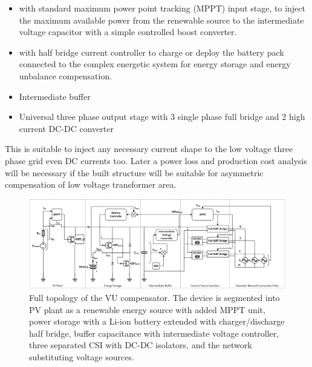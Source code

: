         \begin{itemize}

            \item {} with standard maximum power point tracking (MPPT) input stage, to inject the maximum available power from the renewable source to the intermediate voltage capacitor with a simple controlled boost converter.
            \item {} with half bridge current controller to charge or deploy the battery pack connected to the complex energetic system for energy storage and energy unbalance compensation.
            \item Intermediate buffer 
            \item Universal three phase output stage with 3 single phase full bridge  and 2 high current DC-DC converter
        \end{itemize}
    This is suitable to inject any necessary current shape to the low voltage three phase grid even DC currents too. Later a power loss and production cost analysis will be necessary if the built structure will be suitable for asymmetric compensation of low voltage transformer area.

        \begin{figure}[ht]
        \centering
        \includegraphics[width=1.5\textwidth,angle=-90]{Unblance_EPS_Pics/PowerTopology_full.png}
        \caption{Full topology of the VU compensator. The device is segmented into PV plant as a renewable energy source with added MPPT unit, power storage with a Li-ion battery extended with charger/discharge half bridge, buffer capacitance with intermediate voltage controller, three separated CSI with DC-DC isolators, and the network substituting voltage sources.}
        \label{fig:inv}
        \end{figure}

